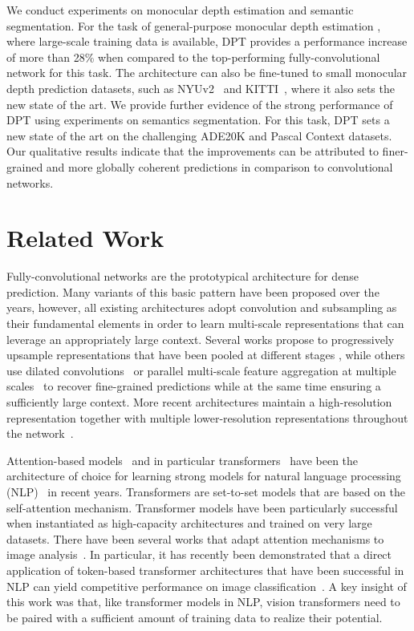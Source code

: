 \documentclass[10pt,twocolumn,letterpaper]{article}
\begin{document}
We conduct experiments on monocular depth estimation and semantic segmentation.
For the task of general-purpose monocular depth estimation \cite{Ranftl2020},
where large-scale training data is available, DPT provides a performance
increase of more than 28\% when compared to the top-performing
fully-convolutional network for this task. The architecture can also be
fine-tuned to small monocular depth prediction datasets, such as
NYUv2~\cite{Silberman2012} and KITTI~\cite{Geiger2012}, where it also sets the
new state of the art. We provide further evidence of the strong performance of
DPT using experiments on semantics segmentation. For this task, DPT sets a new
state of the art on the challenging ADE20K \cite{Zhou2017} and Pascal Context
\cite{Mottaghi2014} datasets. Our qualitative results indicate that the
improvements can be attributed to finer-grained and more globally coherent
predictions in comparison to convolutional networks.



\section{Related Work}
Fully-convolutional networks \cite{Sermanet2014,Shelhamer2015} are the
prototypical architecture for dense prediction. Many variants of this basic
pattern have been proposed over the years, however, all existing architectures
adopt convolution and subsampling as their fundamental elements in order to
learn multi-scale representations that can leverage an appropriately large
context. Several works propose to progressively upsample representations that
have been pooled at different stages
\cite{Ronneberger2015,NohHH15,Lin2017,BadrinarayananK17}, while others use
dilated convolutions~\cite{Yu2016,Chen2017,Chen2018deeplab} or parallel
multi-scale feature aggregation at multiple scales~\cite{Zhao2016} to recover
fine-grained predictions while at the same time ensuring a sufficiently large
context. More recent architectures maintain a high-resolution representation
together with multiple lower-resolution representations throughout the
network~\cite{SunXLW19,Wang2020}.

Attention-based models~\cite{BahdanauCB14} and in particular
transformers~\cite{Vaswani2017} have been the architecture of choice for
learning strong models for natural language processing
(NLP)~\cite{Brown2020,Devlin2019,Liu2019} in recent years. Transformers are
set-to-set models that are based on the self-attention mechanism. Transformer
models have been particularly successful when instantiated as high-capacity
architectures and trained on very large datasets. There have been several works
that adapt attention mechanisms to image
analysis~\cite{Parmar2018,Bello2019,Ramachandran2019,ZhaoJK20,WangZGAYC20}. In
particular, it has recently been demonstrated that a direct application of
token-based transformer architectures that have been successful in NLP can yield
competitive performance on image classification~\cite{Dosovitskiy2020}. A key
insight of this work was that, like transformer models in NLP, vision
transformers need to be paired with a sufficient amount of training data to
realize their potential.
\end{document}
